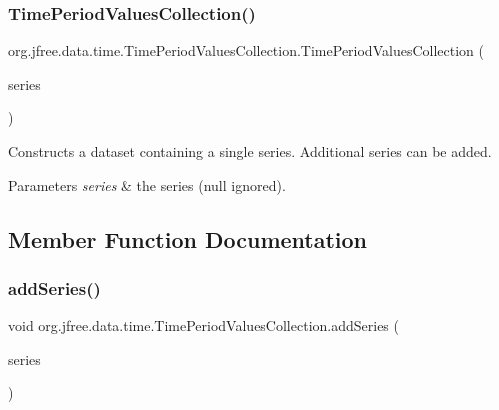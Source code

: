 \subsubsection{\texorpdfstring{Time\+Period\+Values\+Collection()}{TimePeriodValuesCollection()}\hspace{0.1cm}{\footnotesize\ttfamily [2/2]}}
{\footnotesize\ttfamily org.\+jfree.\+data.\+time.\+Time\+Period\+Values\+Collection.\+Time\+Period\+Values\+Collection (\begin{DoxyParamCaption}\item[{\mbox{\hyperlink{classorg_1_1jfree_1_1data_1_1time_1_1_time_period_values}{Time\+Period\+Values}}}]{series }\end{DoxyParamCaption})}

Constructs a dataset containing a single series. Additional series can be added.


\begin{DoxyParams}{Parameters}
{\em series} & the series ({\ttfamily null} ignored). \\
\hline
\end{DoxyParams}


\subsection{Member Function Documentation}
\mbox{\label{classorg_1_1jfree_1_1data_1_1time_1_1_time_period_values_collection_a7dcd1415c748630f4c2829a24d7e095b}} 
\subsubsection{\texorpdfstring{add\+Series()}{addSeries()}}
{\footnotesize\ttfamily void org.\+jfree.\+data.\+time.\+Time\+Period\+Values\+Collection.\+add\+Series (\begin{DoxyParamCaption}\item[{\mbox{\hyperlink{classorg_1_1jfree_1_1data_1_1time_1_1_time_period_values}{Time\+Period\+Values}}}]{series }\end{DoxyParamCaption})}


